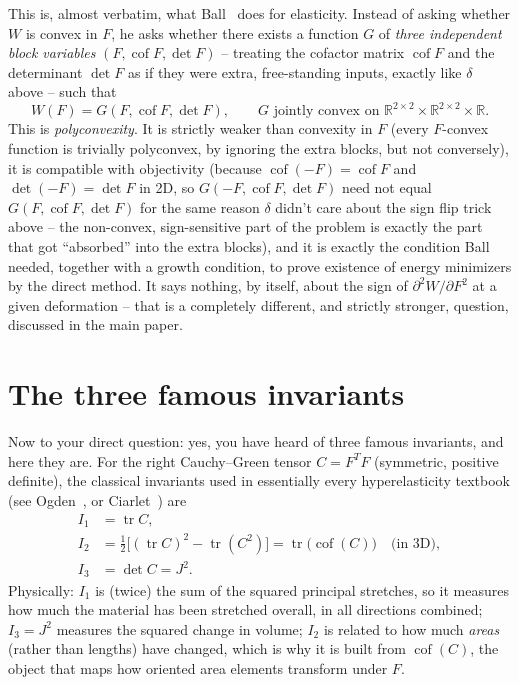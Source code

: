 \documentclass[11pt,a4paper]{article}
\newcommand{\Cof}{\operatorname{cof}}
\newcommand{\tr}{\operatorname{tr}}
\newcommand{\R}{\mathbb{R}}
\begin{document}
This is, almost verbatim, what Ball~\cite{Ball1977} does for
elasticity. Instead of asking whether $W$ is convex in $F$, he asks
whether there exists a function $G$ of \emph{three independent block
variables} $(F,\Cof F,\det F)$ -- treating the cofactor matrix $\Cof F$
and the determinant $\det F$ as if they were extra, free-standing
inputs, exactly like $\delta$ above -- such that
\begin{equation}
 W(F)=G(F,\Cof F,\det F),\qquad G\text{ jointly convex on }
 \R^{2\times2}\times\R^{2\times2}\times\R.
 \label{eq:polyconvex-def}
\end{equation}
This is \emph{polyconvexity}. It is strictly weaker than convexity in
$F$ (every $F$-convex function is trivially polyconvex, by ignoring the
extra blocks, but not conversely), it is compatible with objectivity
(because $\Cof(-F)=\Cof F$ and $\det(-F)=\det F$ in 2D, so
$G(-F,\Cof F,\det F)$ need not equal $G(F,\Cof F,\det F)$ for the same
reason $\delta$ didn't care about the sign flip trick above -- the
non-convex, sign-sensitive part of the problem is exactly the part that
got ``absorbed'' into the extra blocks), and it is exactly the
condition Ball needed, together with a growth condition, to prove
existence of energy minimizers by the direct method. It says nothing,
by itself, about the sign of $\partial^2W/\partial F^2$ at a given
deformation -- that is a completely different, and strictly stronger,
question, discussed in the main paper.

\section{The three famous invariants}
\label{sec:classical-invariants}

Now to your direct question: yes, you have heard of three famous
invariants, and here they are. For the right Cauchy--Green tensor
$C=F^TF$ (symmetric, positive definite), the classical invariants used
in essentially every hyperelasticity textbook (see
Ogden~\cite{Ogden1984}, or Ciarlet~\cite{Ciarlet1988}) are
\begin{align}
 I_1 &= \tr C, \label{eq:I1}\\
 I_2 &= \tfrac12\big[(\tr C)^2-\tr(C^2)\big]
       = \tr\!\big(\Cof(C)\big)\quad\text{(in 3D)}, \label{eq:I2}\\
 I_3 &= \det C = J^2. \label{eq:I3}
\end{align}
Physically: $I_1$ is (twice) the sum of the squared principal
stretches, so it measures how much the material has been stretched
overall, in all directions combined; $I_3=J^2$ measures the squared
change in volume; $I_2$ is related to how much \emph{areas} (rather
than lengths) have changed, which is why it is built from $\Cof(C)$,
the object that maps how oriented area elements transform under $F$.
\end{document}
